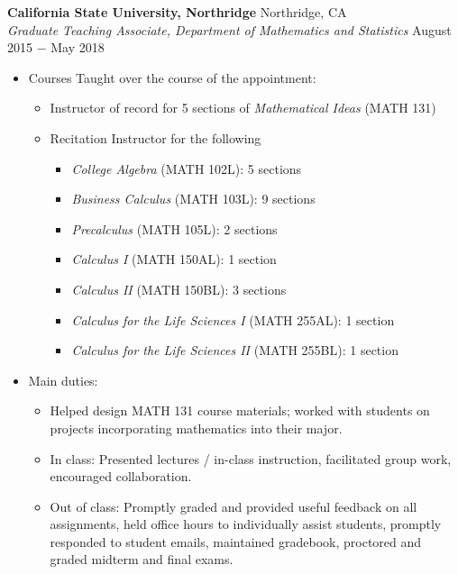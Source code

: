 \documentclass{article}
\begin{document}
\noindent \textbf{California State University, Northridge}
  \hfill Northridge, CA \\
\textit{Graduate Teaching Associate, Department of Mathematics and Statistics} \hfill August 2015 $-$ May 2018
\begin{itemize}[noitemsep,nolistsep,leftmargin=*]
    \item Courses Taught over the course of the appointment:
        \begin{itemize}[noitemsep,nolistsep,leftmargin=*]
            \item Instructor of record for 5 sections of \textit{Mathematical Ideas} (MATH 131)
            \item Recitation Instructor for the following
            \begin{itemize}[noitemsep,nolistsep,leftmargin=*]
                \item \textit{College Algebra} (MATH 102L): 5 sections
                \item \textit{Business Calculus} (MATH 103L): 9 sections
                \item \textit{Precalculus} (MATH 105L): 2 sections
                \item \textit{Calculus I} (MATH 150AL): 1 section
                \item \textit{Calculus II} (MATH 150BL): 3 sections
                \item \textit{Calculus for the Life Sciences I} (MATH 255AL): 1 section
                \item \textit{Calculus for the Life Sciences II} (MATH 255BL): 1 section
            \end{itemize}
        \end{itemize}
    \item Main duties:
        \begin{itemize}[noitemsep,nolistsep,leftmargin=*]
            \item Helped design MATH 131 course materials; worked with students on projects incorporating mathematics into their major.
            \item In class: Presented lectures / in-class instruction, facilitated group work, encouraged collaboration.
            \item Out of class: Promptly graded and provided useful feedback on all assignments, held office hours to individually assist students, promptly responded to student emails, maintained gradebook, proctored and graded midterm and final exams. \\

\end{itemize}
\end{itemize}
\end{document}
